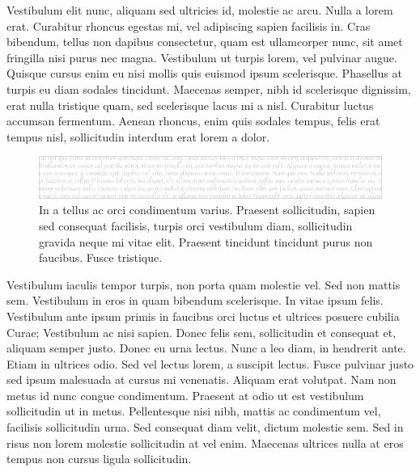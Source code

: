 Vestibulum elit nunc, aliquam sed ultricies id, molestie ac arcu.
Nulla a lorem erat.
Curabitur rhoncus egestas mi, vel adipiscing sapien facilisis in.
Cras bibendum, tellus non dapibus consectetur, quam est ullamcorper nunc, sit amet fringilla nisi purus nec magna.
Vestibulum ut turpis lorem, vel pulvinar augue.
Quisque cursus enim eu nisi mollis quis euismod ipsum scelerisque.
Phasellus at turpis eu diam sodales tincidunt.
Maecenas semper, nibh id scelerisque dignissim, erat nulla tristique quam, sed scelerisque lacus mi a nisl.
Curabitur luctus accumsan fermentum.
Aenean rhoncus, enim quis sodales tempus, felis erat tempus nisl, sollicitudin interdum erat lorem a dolor.

\begin{figure}[tb]
  \centering
  \includegraphics[width=\linewidth]{figs/leaderboard-white}
  \caption[In a tellus ac orci]{
    In a tellus ac orci condimentum varius.
Praesent sollicitudin, sapien sed consequat facilisis, turpis orci vestibulum diam, sollicitudin gravida neque mi vitae elit.
Praesent tincidunt tincidunt purus non faucibus.
Fusce tristique.
  }
\end{figure}

Vestibulum iaculis tempor turpis, non porta quam molestie vel.
Sed non mattis sem.
Vestibulum in eros in quam bibendum scelerisque.
In vitae ipsum felis.
Vestibulum ante ipsum primis in faucibus orci luctus et ultrices posuere cubilia Curae; Vestibulum ac nisi sapien.
Donec felis sem, sollicitudin et consequat et, aliquam semper justo.
Donec eu urna lectus.
Nunc a leo diam, in hendrerit ante.
Etiam in ultrices odio.
Sed vel lectus lorem, a suscipit lectus.
Fusce pulvinar justo sed ipsum malesuada at cursus mi venenatis.
Aliquam erat volutpat.
Nam non metus id nunc congue condimentum.
Praesent at odio ut est vestibulum sollicitudin ut in metus.
Pellentesque nisi nibh, mattis ac condimentum vel, facilisis sollicitudin urna.
Sed consequat diam velit, dictum molestie sem.
Sed in risus non lorem molestie sollicitudin at vel enim.
Maecenas ultrices nulla at eros tempus non cursus ligula sollicitudin.

